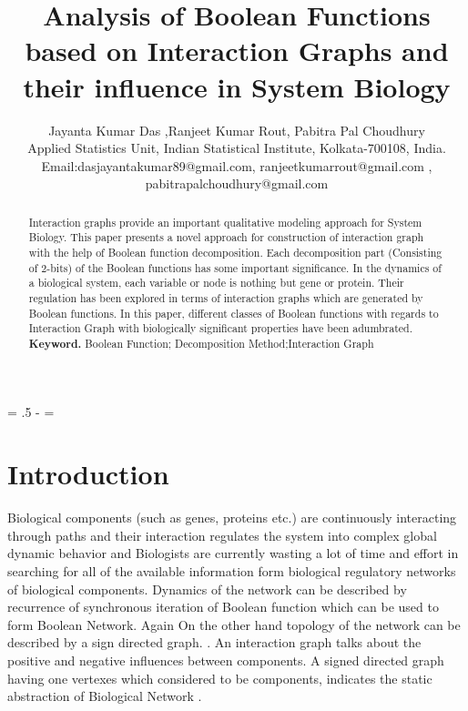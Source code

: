 \documentclass{article}
\newcommand{\ls}[1]
    {\dimen0=\fontdimen6\the\font\lineskip=#1\dimen0
     \advance\lineskip.5\fontdimen5\the\font
     \advance\lineskip-\dimen0
     \lineskiplimit=0.9\lineskip
     \baselineskip=\lineskip
     \advance\baselineskip\dimen0
     \normallineskip\lineskip\normallineskiplimit\lineskiplimit
     \normalbaselineskip\baselineskip
     \ignorespaces}
\begin{document}


\title{Analysis of Boolean Functions based on Interaction Graphs and their influence in System Biology}
\author{Jayanta Kumar Das ,Ranjeet Kumar Rout, Pabitra Pal Choudhury\\
\small  Applied Statistics Unit, Indian Statistical Institute, Kolkata-700108, India.\\
\small Email:dasjayantakumar89@gmail.com,
\small ranjeetkumarrout@gmail.com ,\\
\small pabitrapalchoudhury@gmail.com
}

\date{}
\maketitle

\thispagestyle{plain}
\setcounter{page}{1}
\ls{1.5}


\begin{abstract}
Interaction graphs provide an important qualitative modeling approach for System Biology. This paper presents a novel approach for construction of interaction graph with the help of Boolean function decomposition. Each decomposition part (Consisting of 2-bits) of the Boolean functions has some important significance. In the dynamics of a biological system, each variable or node is nothing but gene or protein. Their regulation has been explored in terms of interaction graphs which are generated by Boolean functions. In this paper, different classes of Boolean functions with regards to Interaction Graph with biologically significant properties have been  adumbrated.
{\bf Keyword.} Boolean Function;  Decomposition Method;Interaction Graph

\end{abstract}

\section{Introduction}
Biological components (such as genes, proteins etc.) are continuously interacting through paths and their interaction regulates  the system into complex global dynamic behavior  and Biologists are currently wasting a lot of time and effort in searching for all of the available information form biological regulatory networks of biological components. Dynamics of the network can be described by recurrence of synchronous iteration of Boolean function which can be used to form Boolean Network. Again On the other hand topology of the network can be described by a sign directed graph. . An interaction graph talks about the positive and negative influences between components. A signed directed graph having one vertexes which considered to be components, indicates the static abstraction of Biological Network .
\end{document}
